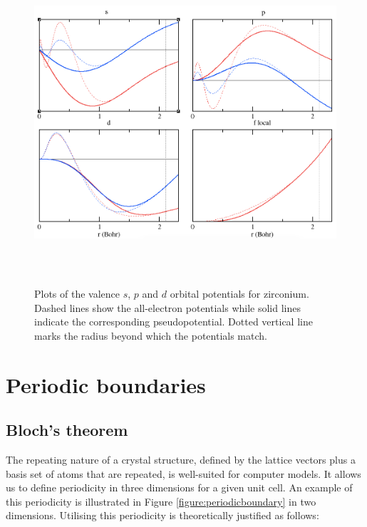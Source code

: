 \begin{figure} %
\label{figure:zirconium_pseudopotential}
\begin{center}
\includegraphics[height=12cm]{images/zirconium_otf_pp.png}
\end{center}
\caption{Plots of the valence $s$, $p$ and $d$ orbital potentials for zirconium. Dashed lines show the all-electron potentials while solid lines indicate the corresponding pseudopotential. Dotted vertical line marks the radius beyond which the potentials match.}
\end{figure}


\section{Periodic boundaries}

\subsection{Bloch's theorem}

The repeating nature of a crystal structure, defined by the lattice vectors plus a basis set of atoms that are repeated, is well-suited for computer models. It allows us to define periodicity in three dimensions for a given unit cell. An example of this periodicity is illustrated in Figure \ref{figure:periodicboundary} in two dimensions. Utilising this periodicity is theoretically justified as follows:

